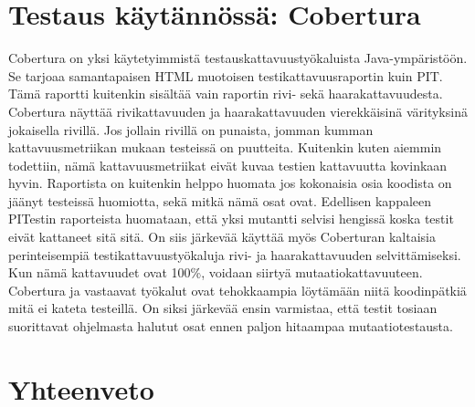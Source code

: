 \documentclass{tktltiki}
\begin{document}

\section{Testaus käytännössä: Cobertura}
Cobertura on yksi käytetyimmistä testauskattavuustyökaluista Java-ympäristöön. Se tarjoaa samantapaisen HTML muotoisen testikattavuusraportin kuin PIT. Tämä raportti kuitenkin sisältää vain raportin rivi- sekä haarakattavuudesta. Cobertura näyttää rivikattavuuden ja haarakattavuuden vierekkäisinä värityksinä jokaisella rivillä. Jos jollain rivillä on punaista, jomman kumman kattavuusmetriikan mukaan testeissä on puutteita. Kuitenkin kuten aiemmin todettiin, nämä kattavuusmetriikat eivät kuvaa testien kattavuutta kovinkaan hyvin. Raportista on kuitenkin helppo huomata jos kokonaisia osia koodista on jäänyt testeissä huomiotta, sekä mitkä nämä osat ovat. Edellisen kappaleen PITestin raporteista huomataan, että yksi mutantti selvisi hengissä koska testit eivät kattaneet sitä sitä. On siis järkevää käyttää myös Coberturan kaltaisia perinteisempiä testikattavuustyökaluja rivi- ja haarakattavuuden selvittämiseksi. Kun nämä kattavuudet ovat 100\%, voidaan siirtyä mutaatiokattavuuteen. Cobertura ja vastaavat työkalut ovat tehokkaampia löytämään niitä koodinpätkiä mitä ei kateta testeillä. On siksi järkevää ensin varmistaa, että testit tosiaan suorittavat ohjelmasta halutut osat ennen paljon hitaampaa mutaatiotestausta.

\section{Yhteenveto}

{}

\end{document}
